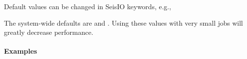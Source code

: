 \documentclass[letterpaper,11pt,english]{sphinxmanual}
\begin{document}
Default values can be changed in SeisIO keywords, e.g.,

\begin{sphinxVerbatim}[commandchars=\\\{\}]
  
  
\end{sphinxVerbatim}

The system-wide defaults are  and . Using these
values with very small jobs will greatly decrease performance.


\paragraph{Examples}
\end{document}
